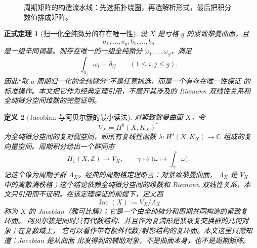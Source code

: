\documentclass[UTF8,fontset=none,a4paper,11pt]{ctexart}
\theoremstyle{foundation-definition}
\newtheorem{definition}{定义}[section]
\theoremstyle{foundation-theorem}
\newtheorem{theorem}[definition]{正式定理}
\theoremstyle{foundation-proposition}
\theoremstyle{foundation-example}
\theoremstyle{foundation-remark}
\theoremstyle{foundation-theorem}
\begin{document}
\begin{figure}[htbp]
\centering
{}
\caption{周期矩阵的构造流水线：先选拓扑绕圈，再选解析形式，最后把积分数值排成矩阵。}
\label{fig:period-matrix-pipeline}
\end{figure}

\begin{theorem}[归一化全纯微分的存在唯一性]\label{thm:normalized-differentials}
设 \(X\) 是亏格 \(g\) 的紧致黎曼曲面，且
\[
a_1,\ldots,a_g,b_1,\ldots,b_g
\]
是一组辛同调基。则存在唯一的一组全纯微分
\(\omega_1,\ldots,\omega_g\)，满足
\[
\int_{a_j}\omega_i=\delta_{ij}\qquad(1\leq i,j\leq g).
\]
因此“取 \(a\)-周期归一化的全纯微分”不是任意挑选，而是一个有存在唯一性保证
的标准操作。本文把它作为经典定理引用，不展开其涉及的 Riemann 双线性关系和
全纯微分空间维数的完整证明。
\end{theorem}

\begin{definition}[Jacobian 与阿贝尔簇的最小读法]\label{def:jacobian}
对紧致黎曼曲面 \(X\)，令
\[
V_X=H^0(X,K_X)^*
\]
为全纯微分空间的复对偶空间，即所有复线性函数
\(\lambda:H^0(X,K_X)\to\mathbb C\) 组成的复向量空间。周期积分给出一个群同态
\[
H_1(X,\mathbb Z)\longrightarrow V_X,\qquad
\gamma\longmapsto\bigl(\omega\longmapsto\int_\gamma\omega\bigr).
\]
记这个像为周期子群 \(\Lambda_X\)。经典的周期格定理断言：对紧致黎曼曲面，
\(\Lambda_X\) 是 \(V_X\) 中的离散满秩格；这个结论依赖全纯微分空间的维数和
Riemann 双线性关系，本文只引用而不证明。在该定理保证的前提下，定义商
\[
\operatorname{Jac}(X):=V_X/\Lambda_X
\]
称为 \(X\) 的 Jacobian（雅可比簇）；它是一个由全纯微分和周期共同构造的紧致复环面。
阿贝尔簇是同时具有代数结构、并且作为复流形是紧致复交换群的几何对象；在复数域上，
它可以看作带有额外代数/射影结构的复环面。本文这里只需知道：Jacobian 是从曲面
出发得到的辅助对象，不是曲面本身，也不是周期矩阵。
\end{definition}
\end{document}
